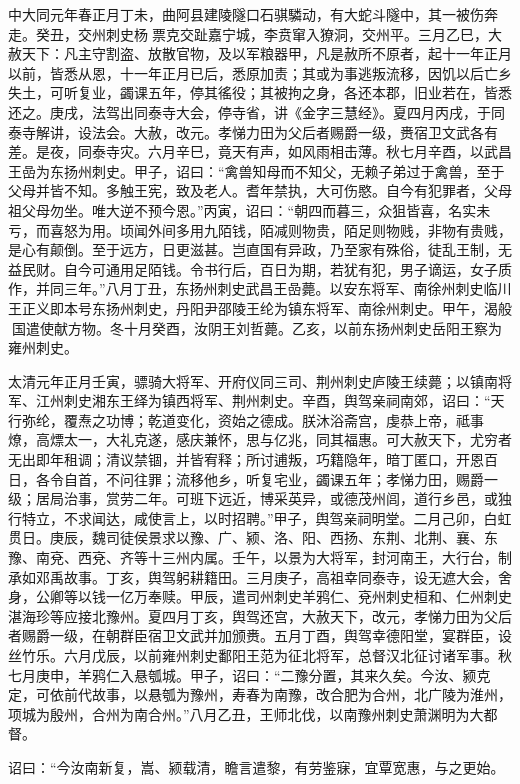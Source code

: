 \documentclass[12pt,UTF8]{ctexbook}
\begin{document}
中大同元年春正月丁未，曲阿县建陵隧口石骐驎动，有大蛇斗隧中，其一被伤奔走。癸丑，交州刺史杨票克交趾嘉宁城，李贲窜入獠洞，交州平。三月乙巳，大赦天下：凡主守割盗、放散官物，及以军粮器甲，凡是赦所不原者，起十一年正月以前，皆悉从恩，十一年正月已后，悉原加责；其或为事逃叛流移，因饥以后亡乡失土，可听复业，蠲课五年，停其徭役；其被拘之身，各还本郡，旧业若在，皆悉还之。庚戌，法驾出同泰寺大会，停寺省，讲《金字三慧经》。夏四月丙戌，于同泰寺解讲，设法会。大赦，改元。孝悌力田为父后者赐爵一级，赉宿卫文武各有差。是夜，同泰寺灾。六月辛巳，竟天有声，如风雨相击薄。秋七月辛酉，以武昌王嵒为东扬州刺史。甲子，诏曰：“禽兽知母而不知父，无赖子弟过于禽兽，至于父母并皆不知。多触王宪，致及老人。耆年禁执，大可伤愍。自今有犯罪者，父母祖父母勿坐。唯大逆不预今恩。”丙寅，诏曰：“朝四而暮三，众狙皆喜，名实未亏，而喜怒为用。顷闻外间多用九陌钱，陌减则物贵，陌足则物贱，非物有贵贱，是心有颠倒。至于远方，日更滋甚。岂直国有异政，乃至家有殊俗，徒乱王制，无益民财。自今可通用足陌钱。令书行后，百日为期，若犹有犯，男子谪运，女子质作，并同三年。”八月丁丑，东扬州刺史武昌王嵒薨。以安东将军、南徐州刺史临川王正义即本号东扬州刺史，丹阳尹邵陵王纶为镇东将军、南徐州刺史。甲午，渴般国遣使献方物。冬十月癸酉，汝阴王刘哲薨。乙亥，以前东扬州刺史岳阳王察为雍州刺史。

太清元年正月壬寅，骠骑大将军、开府仪同三司、荆州刺史庐陵王续薨；以镇南将军、江州刺史湘东王绎为镇西将军、荆州刺史。辛酉，舆驾亲祠南郊，诏曰：“天行弥纶，覆焘之功博；乾道变化，资始之德成。朕沐浴斋宫，虔恭上帝，祗事燎，高熛太一，大礼克遂，感庆兼怀，思与亿兆，同其福惠。可大赦天下，尤穷者无出即年租调；清议禁锢，并皆宥释；所讨逋叛，巧籍隐年，暗丁匿口，开恩百日，各令自首，不问往罪；流移他乡，听复宅业，蠲课五年；孝悌力田，赐爵一级；居局治事，赏劳二年。可班下远近，博采英异，或德茂州闾，道行乡邑，或独行特立，不求闻达，咸使言上，以时招聘。”甲子，舆驾亲祠明堂。二月己卯，白虹贯日。庚辰，魏司徒侯景求以豫、广、颍、洛、阳、西扬、东荆、北荆、襄、东豫、南兗、西兗、齐等十三州内属。壬午，以景为大将军，封河南王，大行台，制承如邓禹故事。丁亥，舆驾躬耕籍田。三月庚子，高祖幸同泰寺，设无遮大会，舍身，公卿等以钱一亿万奉赎。甲辰，遣司州刺史羊鸦仁、兗州刺史桓和、仁州刺史湛海珍等应接北豫州。夏四月丁亥，舆驾还宫，大赦天下，改元，孝悌力田为父后者赐爵一级，在朝群臣宿卫文武并加颁赉。五月丁酉，舆驾幸德阳堂，宴群臣，设丝竹乐。六月戊辰，以前雍州刺史鄱阳王范为征北将军，总督汉北征讨诸军事。秋七月庚申，羊鸦仁入悬瓠城。甲子，诏曰：“二豫分置，其来久矣。今汝、颍克定，可依前代故事，以悬瓠为豫州，寿春为南豫，改合肥为合州，北广陵为淮州，项城为殷州，合州为南合州。”八月乙丑，王师北伐，以南豫州刺史萧渊明为大都督。

诏曰：“今汝南新复，嵩、颍载清，瞻言遣黎，有劳鉴寐，宜覃宽惠，与之更始。
\end{document}
